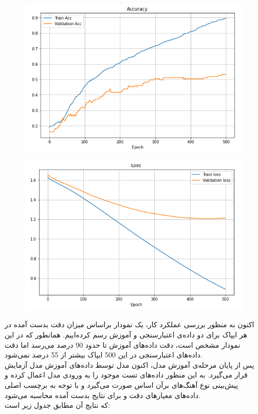 \documentclass[10pt,onecolumn,a4paper]{article}
\begin{document}
\begin{figure}[h!]
        \centering
        \includegraphics[scale=0.5]{c.png}
        \caption{  }  
    \end{figure}
  
\begin{figure}[h!]
        \centering
        \includegraphics[scale=0.5]{d.png}
        \caption{  }  
    \end{figure}

اکنون به منظور بررسی عملکرد کار، یک نمودار براساس میزان دقت بدست آمده در هر ایپاک برای دو داده‌ی اعتبارسنجی و آموزش رسم کرده‌اییم. همانطور که در این نمودار مشخص است، دقت داده‌‌های آموزش تا حدود 90 درصد می‌رسد اما دقت داده‌های اعتبارسنجی در این 500 ایپاک بیشتر از 55 درصد نمی‌شود. \\

پس از پایان مرحله‌ی آموزش مدل، اکنون مدل توسط داده‌های آموزش مدل آزمایش قرار می‌گیرد. به این منظور داده‌های تست موجود را به ورودی مدل اعمال کرده و پیش‌بینی نوع آهنگ‌های برآن اساس صورت می‌گیرد و با توجه به برچسب اصلی داده‌های معیارهای دقت و   برای نتایج بدست آمده محاسبه می‌شود.\\ 
که نتایج آن مطابق جدول زیر است:\\
\end{document}
